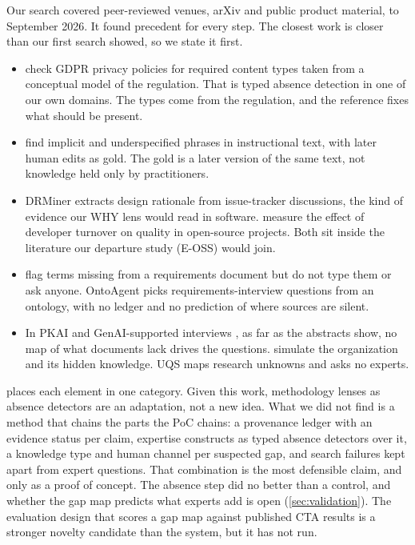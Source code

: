 Our search covered peer-reviewed venues, arXiv and public product material, to September 2026. It
found precedent for every step. The closest work is closer than our first search showed, so we
state it first.
\begin{itemize}[nosep]
  \item \textcite{torre2020ai} check GDPR privacy policies for required content types taken from a
    conceptual model of the regulation. That is typed absence detection in one of our own domains.
    The types come from the regulation, and the reference fixes what should be present.
  \item \textcite{anthonio2022clarifying} find implicit and underspecified phrases in instructional
    text, with later human edits as gold. The gold is a later version of the same text, not
    knowledge held only by practitioners.
  \item DRMiner \parencite{zhao2024drminer} extracts design rationale from issue-tracker discussions,
    the kind of evidence our WHY lens would read in software. \textcite{foucault2015impact} measure
    the effect of developer turnover on quality in open-source projects. Both sit inside the
    literature our departure study (E-OSS) would join.
  \item \textcite{luitel2024improving} flag terms missing from a requirements document but do not
    type them or ask anyone. OntoAgent \parencite{jin2026chat} picks requirements-interview questions
    from an ontology, with no ledger and no prediction of where sources are silent.
  \item In PKAI \parencite{schinckus2025large} and GenAI-supported interviews \parencite{walther2026genai},
    as far as the abstracts show, no map of what documents lack drives the questions.
    \textcite{zuin2025leveraging} simulate the organization and its hidden knowledge. UQS
    \parencite{ono2026mapping} maps research unknowns and asks no experts.
\end{itemize}

\evint{}  places each element in one category. Given this work, methodology lenses
as absence detectors are an adaptation, not a new idea. What we did not find is a method that chains
the parts the PoC chains:
a provenance ledger with an evidence status per claim, expertise constructs as typed absence
detectors over it, a knowledge type and human channel per suspected gap, and search failures kept
apart from expert questions. That combination is the most defensible claim, and only as a proof of
concept. The absence step did no better than a control, and whether the gap map predicts what experts
add is open (\cref{sec:validation}). The evaluation design that scores a gap map against published
CTA results is a stronger novelty candidate than the system, but it has not run.
